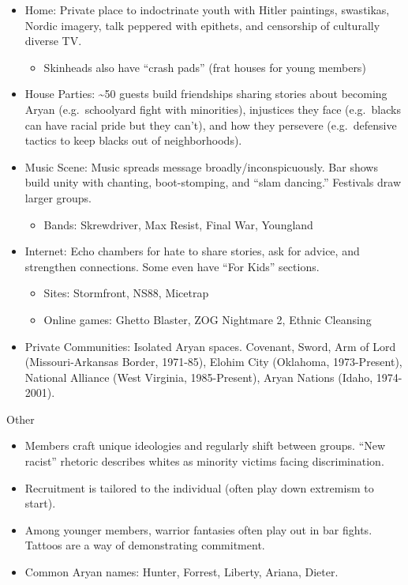 \documentclass[
]{article}
\providecommand{\tightlist}{%
  \setlength{\itemsep}{0pt}\setlength{\parskip}{0pt}}
\begin{document}
\begin{itemize}
\item
  Home: Private place to indoctrinate youth with Hitler paintings,
  swastikas, Nordic imagery, talk peppered with epithets, and censorship
  of culturally diverse TV.

  \begin{itemize}
  \tightlist
  \item
    Skinheads also have ``crash pads'' (frat houses for young members)
  \end{itemize}
\item
  House Parties: \textasciitilde50 guests build friendships sharing
  stories about becoming Aryan (e.g.~schoolyard fight with minorities),
  injustices they face (e.g.~blacks can have racial pride but they
  can't), and how they persevere (e.g.~defensive tactics to keep blacks
  out of neighborhoods).
\item
  Music Scene: Music spreads message broadly/inconspicuously. Bar shows
  build unity with chanting, boot-stomping, and ``slam dancing.''
  Festivals draw larger groups.

  \begin{itemize}
  \tightlist
  \item
    Bands: Skrewdriver, Max Resist, Final War, Youngland
  \end{itemize}
\item
  Internet: Echo chambers for hate to share stories, ask for advice, and
  strengthen connections. Some even have ``For Kids'' sections.

  \begin{itemize}
  \item
    Sites: Stormfront, NS88, Micetrap
  \item
    Online games: Ghetto Blaster, ZOG Nightmare 2, Ethnic Cleansing
  \end{itemize}
\item
  Private Communities: Isolated Aryan spaces. Covenant, Sword, Arm of
  Lord (Missouri-Arkansas Border, 1971-85), Elohim City (Oklahoma,
  1973-Present), National Alliance (West Virginia, 1985-Present), Aryan
  Nations (Idaho, 1974-2001).
\end{itemize}

Other

\begin{itemize}
\item
  Members craft unique ideologies and regularly shift between groups.
  ``New racist'' rhetoric describes whites as minority victims facing
  discrimination.
\item
  Recruitment is tailored to the individual (often play down extremism
  to start).
\item
  Among younger members, warrior fantasies often play out in bar fights.
  Tattoos are a way of demonstrating commitment.
\item
  Common Aryan names: Hunter, Forrest, Liberty, Ariana, Dieter.
\end{itemize}
\end{document}
